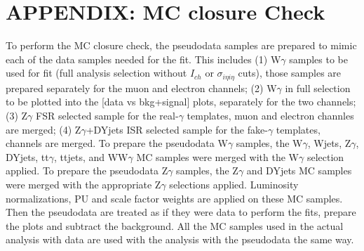 \section{APPENDIX: MC closure Check}
\label{sec:MCclosureCheck}

To perform the MC closure check, the pseudodata samples are prepared to mimic each of the data samples needed for the fit. This includes (1) W$\gamma$ samples to be used for fit (full analysis selection without $I_{ch}$ or $\sigma_{i\eta i\eta}$ cuts), those samples are prepared separately for the muon and electron channels; (2) W$\gamma$ in full selection to be plotted into the [data vs bkg+signal] plots, separately for the two channels; (3) Z$\gamma$ FSR selected sample for the real-$\gamma$ templates, muon and electron channles are merged; (4) Z$\gamma$+DYjets ISR selected sample for the fake-$\gamma$ templates, channels are merged. To prepare the pseudodata W$\gamma$ samples, the W$\gamma$, Wjets, Z$\gamma$, DYjets, tt$\gamma$, ttjets, and WW$\gamma$ MC samples were merged with the W$\gamma$ selection applied. To prepare the pseudodata Z$\gamma$ samples, the Z$\gamma$ and DYjets MC samples were merged with the appropriate Z$\gamma$ selections applied. Luminosity normalizations, PU and scale factor weights are applied on these MC samples.\\   
Then the pseudodata are treated as if they were data to perform the fits, prepare the plots and subtract the background. All the MC samples used in the actual analysis with data are used with the analysis with the pseudodata the same way.\\

